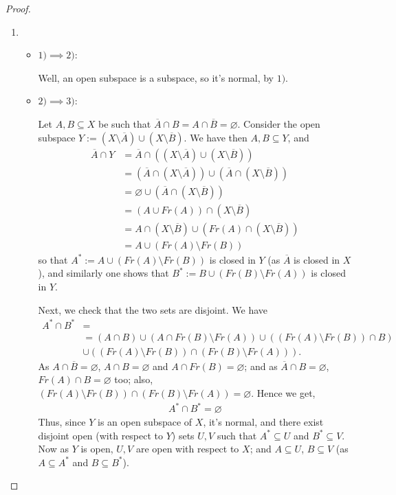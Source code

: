 \documentclass[12pt]{extarticle}
\newcommand{\<}{\langle}
\renewcommand{\>}{\rangle}
\renewcommand{\emptyset}{\varnothing}
\theoremstyle{definition}
\begin{document}
\begin{proof}
  \begin{enumerate}
  \item
    \begin{itemize}
    \item $1) \implies 2)$:

      Well, an open subspace is a subspace, so it's normal, by $1)$.
    \item $2) \implies 3)$:

      Let $A, B \subseteq X$ be such that $\overline{A} \cap B = A \cap \overline{B} = \emptyset$. Consider the open subspace $Y := (X \setminus \overline{A}) \cup (X \setminus \overline{B})$. We have then $A,B \subseteq Y$, and
      \begin{align*}
        \overline{A} \cap Y &= \overline{A} \cap ((X \setminus \overline{A}) \cup (X \setminus \overline{B})) \\ 
        &= (\overline{A} \cap (X \setminus \overline{A})) \cup (\overline{A} \cap (X \setminus \overline{B})) \\
        &= \emptyset \cup (\overline{A} \cap (X \setminus \overline{B})) \\
        &= (A \cup Fr(A)) \cap (X \setminus \overline{B}) \\
        &= A \cap (X \setminus \overline{B}) \cup (Fr(A) \cap (X \setminus \overline{B})) \\
        &= A \cup (Fr(A) \setminus Fr(B))
      \end{align*}
      so that $A^{*} := A \cup (Fr(A) \setminus Fr(B))$ is closed in $Y$ (as $\overline{A}$ is closed in $X$), and similarly one shows that $B^{*} := B \cup (Fr(B) \setminus Fr(A))$ is closed in $Y$.

      Next, we check that the two sets are disjoint. We have
      \begin{align*}
        A^{*} \cap B^{*} &= \\
        &= (A \cap B) \cup (A \cap Fr(B) \setminus Fr(A)) \cup ((Fr(A) \setminus Fr(B)) \cap B) \\
        &\cup ((Fr(A) \setminus Fr(B)) \cap (Fr(B) \setminus Fr(A))).
      \end{align*}
      As $A \cap \overline{B} = \emptyset$, $A \cap B = \emptyset$ and $A \cap Fr(B) = \emptyset$; and as $\overline{A} \cap B = \emptyset$, $Fr(A) \cap B = \emptyset$ too; also,
      $(Fr(A) \setminus Fr(B)) \cap (Fr(B) \setminus Fr(A)) = \emptyset$. Hence we get,
      \begin{align*}
        A^{*} \cap B^{*} = \emptyset
      \end{align*}
      Thus, since $Y$ is an open subspace of $X$, it's normal, and there exist disjoint open (with respect to $Y$) sets $U,V$ such that
      $A^{*} \subseteq U$ and $B^{*} \subseteq V$. Now as $Y$ is open, $U, V$ are open with respect to $X$; and $A \subseteq U$, $B \subseteq V$ (as $A \subseteq A^{*}$ and $B \subseteq B^{*}$).


\end{itemize}
\end{enumerate}
\end{proof}
\end{document}
